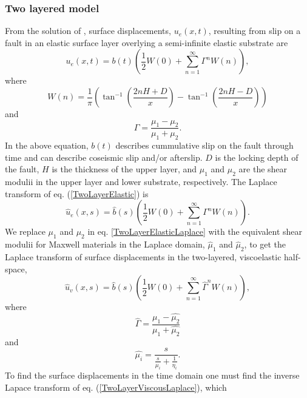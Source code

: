 \documentclass[extra,mreferee]{gji}
\begin{document}
\subsubsection{Two layered model}
From the solution of \citet{R1971}, surface displacements,
$u_{e}(x,t)$, resulting from slip on a fault in an elastic surface
layer overlying a semi-infinite elastic substrate are
\begin{equation}\label{TwoLayerElastic}
  u_{e}(x,t) = b(t)\left(\frac{1}{2} W(0) + 
    \sum_{n=1}^\infty \Gamma^nW(n)\right),
\end{equation}
where
\begin{equation}
  W(n) = \frac{1}{\pi}\left(\tan^{-1}\left(\frac{2nH + D}{x}\right) 
    - \tan^{-1}\left(\frac{2nH - D}{x}\right)\right)
\end{equation}
and
\begin{equation}
  \Gamma = \frac{\mu_1 - \mu_2}{\mu_1 + \mu_2}.
\end{equation}
In the above equation, $b(t)$ describes cummulative slip on the fault
through time and can describe coseismic slip and/or afterslip. $D$ is
the locking depth of the fault, $H$ is the thickness of the upper
layer, and $\mu_1$ and $\mu_2$ are the shear modulii in the upper
layer and lower substrate, respectively.  The Laplace transform of
eq. (\ref{TwoLayerElastic}) is
\begin{equation}\label{TwoLayerElasticLaplace}
 \hat{u}_e(x,s) = \hat{b}(s)\left(\frac{1}{2} W(0) +\sum_{n=1}^\infty\Gamma^nW(n)\right).
\end{equation}
We replace $\mu_1$ and $\mu_2$ in eq. \ref{TwoLayerElasticLaplace}
with the equivalent shear modulii for Maxwell materials in the Laplace
domain, $\hat{\mu}_1$ and $\hat{\mu}_2$, to get the Laplace
transform of surface displacements in the two-layered, viscoelastic
half-space,
\begin{equation}\label{TwoLayerViscousLaplace}
 \hat{u}_v(x,s) = \hat{b}(s)\left(\frac{1}{2}W(0) +\sum_{n=1}^\infty\hat{\Gamma}^nW(n)\right),
\end{equation}
where
\begin{equation}
  \hat{\Gamma} = \frac{\hat{\mu_1} - \hat{\mu_2}}{\hat{\mu_1} + \hat{\mu_2}}
\end{equation}
and
\begin{equation}
  \hat{\mu_i} = \frac{s}{\frac{s}{\mu_i} + \frac{1}{\eta_i}}.
\end{equation}
To find the surface displacements in the time domain one must find the
inverse Lapace transform of eq. (\ref{TwoLayerViscousLaplace}), which
\end{document}
